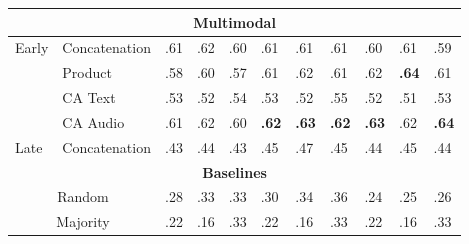 \documentclass{article}
\begin{document}
\begin{table}[h]
\begin{tabular}{|lllllllllll|}
\multicolumn{11}{|c|}{\textbf{Multimodal}}                                                                                                                                                                                                                         \\ \hline
\multicolumn{1}{|l|}{\multirow{4}{*}{Early}} & \multicolumn{1}{l|}{Concatenation} & .61          & .62          & \multicolumn{1}{l|}{.60}          & .61          & .61          & \multicolumn{1}{l|}{.61}          & .60          & .61          & .59          \\
\multicolumn{1}{|l|}{}                       & \multicolumn{1}{l|}{Product}       & .58          & .60          & \multicolumn{1}{l|}{.57}          & .61          & .62          & \multicolumn{1}{l|}{.61}          & .62          & \textbf{.64} & .61          \\
\multicolumn{1}{|l|}{}                       & \multicolumn{1}{l|}{CA Text}       & .53          & .52          & \multicolumn{1}{l|}{.54}          & .53          & .52          & \multicolumn{1}{l|}{.55}          & .52          & .51          & .53          \\
\multicolumn{1}{|l|}{}                       & \multicolumn{1}{l|}{CA Audio}      & .61          & .62          & \multicolumn{1}{l|}{.60}          & \textbf{.62} & \textbf{.63} & \multicolumn{1}{l|}{\textbf{.62}} & \textbf{.63} & .62          & \textbf{.64} \\ \hline
\multicolumn{1}{|l|}{Late}                   & \multicolumn{1}{l|}{Concatenation} & .43          & .44          & \multicolumn{1}{l|}{.43}             & .45          & .47           & \multicolumn{1}{l|}{.45}             & .44          & .45          & .44          \\ \hline
\multicolumn{11}{|c|}{\textbf{Baselines}}                                                                                                                                                                                                                          \\ \hline
\multicolumn{2}{|c|}{Random}                                                      & .28          & .33          & \multicolumn{1}{l|}{.33}          & .30          & .34          & \multicolumn{1}{l|}{.36}          & .24          & .25          & .26          \\
\multicolumn{2}{|c|}{Majority}                                                    & .22          & .16          & \multicolumn{1}{l|}{.33}          & .22          & .16          & \multicolumn{1}{l|}{.33}          & .22          & .16          & .33          \\ \hline
\end{tabular}
\end{table}
\end{document}
